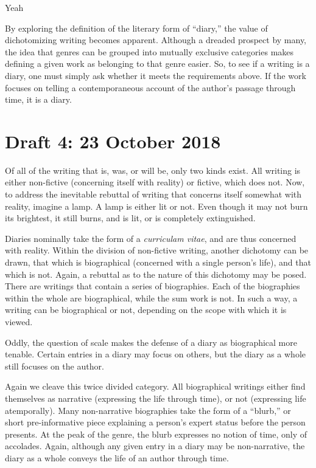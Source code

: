Yeah \documentclass[12pt]{article}[titlepage]
\newcommand{\say}[1]{``#1''}
\newcommand{\1}{\={a}}
\newcommand{\2}{\={e}}
\newcommand{\3}{\={\i}}
\newcommand{\4}{\=o}
\newcommand{\5}{\=u}
\newcommand{\6}{\={A}}
\renewcommand{\,}{\textsuperscript{,}}
\begin{document}
By exploring the definition of the literary form of \say{diary,} the value of dichotomizing writing becomes apparent.
Although a dreaded prospect by many, the idea that genres can be grouped into mutually exclusive categories makes defining a given work as belonging to that genre easier.
So, to see if a writing is a diary, one must simply ask whether it meets the requirements above.
If the work focuses on telling a contemporaneous account of the author's passage through time, it is a diary. 
 
\section{Draft 4: 23 October 2018}
Of all of the writing that is, was, or will be, only two kinds exist.
All writing is either non-fictive (concerning itself with reality) or fictive, which does not.
Now, to address the inevitable rebuttal of writing that concerns itself somewhat with reality, imagine a lamp.
A lamp is either lit or not.
Even though it may not burn its brightest, it still burns, and is lit, or is completely extinguished.

Diaries nominally take the form of a \textit{curriculam vitae}, and are thus concerned with reality.
Within the division of non-fictive writing, another dichotomy can be drawn, that which is biographical (concerned with a single person's life), and that which is not.
Again, a rebuttal as to the nature of this dichotomy may be posed.
There are writings that contain a series of biographies.
Each of the biographies within the whole are biographical, while the sum work is not.
In such a way, a writing can be biographical or not, depending on the scope with which it is viewed.

Oddly, the question of scale makes the defense of a diary as biographical more tenable.
Certain entries in a diary may focus on others, but the diary as a whole still focuses on the author.

Again we cleave this twice divided category.
All biographical writings either find themselves as narrative (expressing the life through time), or not (expressing life atemporally).
Many non-narrative biographies take the form of a \say{blurb,} or short pre-informative piece explaining a person's expert status before the person presents.
At the peak of the genre, the blurb expresses no notion of time, only of accolades.
Again, although any given entry in a diary may be non-narrative, the diary as a whole conveys the life of an author through time.
\end{document}
